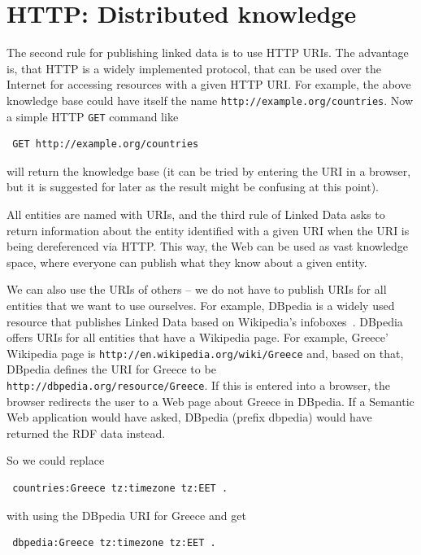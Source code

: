 \section{HTTP: Distributed knowledge}
\label{http}

The second rule for publishing linked data is to use HTTP URIs.
The advantage is, that HTTP is a widely implemented protocol, that can be used over the Internet for accessing resources with a given HTTP URI.
For example, the above knowledge base could have itself the name \texttt{http://example.org/countries}.
Now a simple HTTP \texttt{GET} command like

\begin{verbatim}
 GET http://example.org/countries
\end{verbatim}

will return the knowledge base (it can be tried by entering the URI in a browser, but it is suggested for later as the result might be confusing at this point).

All entities are named with URIs, and the third rule of Linked Data asks to return information about the entity identified with a given URI when the URI is being dereferenced via HTTP.
This way, the Web can be used as vast knowledge space, where everyone can publish what they know about a given entity.

We can also use the URIs of others -- we do not have to publish URIs for all entities that we want to use ourselves.
For example, DBpedia is a widely used resource that publishes Linked Data based on Wikipedia's infoboxes~\cite{dbpedia}.
DBpedia offers URIs for all entities that have a Wikipedia page.
For example, Greece' Wikipedia page is \texttt{http://en.wikipedia.org/wiki/Greece} and, based on that, DBpedia defines the URI for Greece to be \texttt{http://dbpedia.org/resource/Greece}.
If this is entered into a browser, the browser redirects the user to a Web page about Greece in DBpedia.
If a Semantic Web application would have asked, DBpedia (prefix dbpedia) would have returned the RDF data instead.

So we could replace

\begin{verbatim}
 countries:Greece tz:timezone tz:EET .
\end{verbatim}

with using the DBpedia URI for Greece and get

\begin{verbatim}
 dbpedia:Greece tz:timezone tz:EET .
\end{verbatim}

